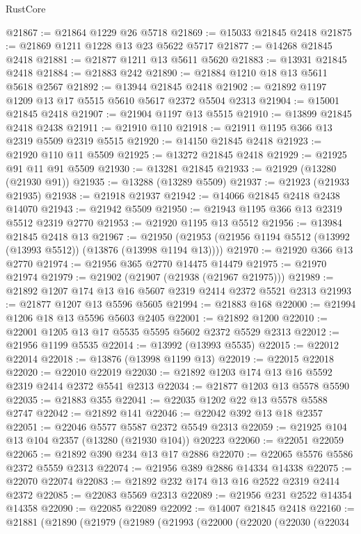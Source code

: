 \begin{lexlean}{RustCore}
\begin{coremodule}
@21867 := @21864 @1229 @26 @5718
@21869 := @15033 @21845 @2418
@21875 := @21869 @1211 @1228 @13 @23 @5622 @5717
@21877 := @14268 @21845 @2418
@21881 := @21877 @1211 @13 @5611 @5620
@21883 := @13931 @21845 @2418
@21884 := @21883 @242
@21890 := @21884 @1210 @18 @13 @5611 @5618 @2567
@21892 := @13944 @21845 @2418
@21902 := @21892 @1197 @1209 @13 @17 @5515 @5610 @5617 @2372 @5504 @2313
@21904 := @15001 @21845 @2418
@21907 := @21904 @1197 @13 @5515
@21910 := @13899 @21845 @2418 @2438
@21911 := @21910 @110
@21918 := @21911 @1195 @366 @13 @2319 @5509 @2319 @5515
@21920 := @14150 @21845 @2418
@21923 := @21920 @110 @11 @5509
@21925 := @13272 @21845 @2418
@21929 := @21925 @91 @11 @91 @5509
@21930 := @13281 @21845
@21933 := @21929 (@13280 (@21930 @91))
@21935 := @13288 (@13289 @5509)
@21937 := @21923 (@21933 @21935)
@21938 := @21918 @21937
@21942 := @14066 @21845 @2418 @2438 @14070
@21943 := @21942 @5509
@21950 := @21943 @1195 @366 @13 @2319 @5512 @2319 @2770
@21953 := @21920 @1195 @13 @5512
@21956 := @13984 @21845 @2418 @13
@21967 := @21950 (@21953 (@21956 @1194 @5512 (@13992 (@13993 @5512)) (@13876 (@13998 @1194 @13))))
@21970 := @21920 @366 @13 @2770
@21974 := @21956 @365 @2770 @14475 @14479
@21975 := @21970 @21974
@21979 := @21902 (@21907 (@21938 (@21967 @21975)))
@21989 := @21892 @1207 @174 @13 @16 @5607 @2319 @2414 @2372 @5521 @2313
@21993 := @21877 @1207 @13 @5596 @5605
@21994 := @21883 @168
@22000 := @21994 @1206 @18 @13 @5596 @5603 @2405
@22001 := @21892 @1200
@22010 := @22001 @1205 @13 @17 @5535 @5595 @5602 @2372 @5529 @2313
@22012 := @21956 @1199 @5535
@22014 := @13992 (@13993 @5535)
@22015 := @22012 @22014
@22018 := @13876 (@13998 @1199 @13)
@22019 := @22015 @22018
@22020 := @22010 @22019
@22030 := @21892 @1203 @174 @13 @16 @5592 @2319 @2414 @2372 @5541 @2313
@22034 := @21877 @1203 @13 @5578 @5590
@22035 := @21883 @355
@22041 := @22035 @1202 @22 @13 @5578 @5588 @2747
@22042 := @21892 @141
@22046 := @22042 @392 @13 @18 @2357
@22051 := @22046 @5577 @5587 @2372 @5549 @2313
@22059 := @21925 @104 @13 @104 @2357 (@13280 (@21930 @104)) @20223
@22060 := @22051 @22059
@22065 := @21892 @390 @234 @13 @17 @2886
@22070 := @22065 @5576 @5586 @2372 @5559 @2313
@22074 := @21956 @389 @2886 @14334 @14338
@22075 := @22070 @22074
@22083 := @21892 @232 @174 @13 @16 @2522 @2319 @2414 @2372
@22085 := @22083 @5569 @2313
@22089 := @21956 @231 @2522 @14354 @14358
@22090 := @22085 @22089
@22092 := @14007 @21845 @2418
@22160 := @21881
    (@21890
      (@21979
        (@21989
          (@21993
            (@22000
              (@22020
                (@22030
                  (@22034

\end{coremodule}
\end{lexlean}
